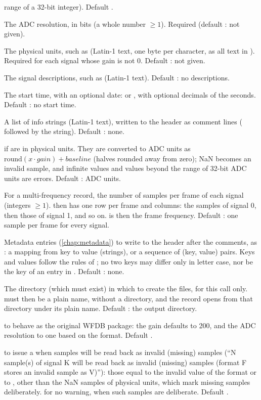 \begin{params}
  range of a 32-bit integer). Default .
\item[adcres] The ADC resolution, in bits (a whole number $\ge 1$). Required (default
  : not given).
\item[units] The physical units, such as  (Latin-1 text, one byte per
  character, as all text in ). Required for each signal whose gain is not 0.
  Default : not given.
\item[names] The signal descriptions, such as  (Latin-1 text). Default
  : no descriptions.
\item[base\_time] The start time, with an optional date:
   or , with optional decimals of the
  seconds. Default : no start time.
\item[comments] A list of info strings (Latin-1 text), written to the header as comment lines
  ( followed by the string). Default : none.
\item[physical]  if  are in physical units. They are converted
  to ADC units as $\mathrm{round}(x \cdot \mathit{gain}) + \mathit{baseline}$ (halves
  rounded away from zero); NaN becomes an invalid sample, and infinite values and values
  beyond the range of 32-bit ADC units are errors. Default : ADC units.
\item[samps\_per\_frame] For a multi-frequency record, the number of samples per frame of
  each signal (integers $\ge 1$).  then has one row per frame and
   columns: the samples of signal 0, then those of signal 1,
  and so on.  is then the frame frequency. Default : one sample per
  frame for every signal.
\item[metadata] Metadata entries (\cref{chap:metadata}) to write to the header after the
  comments, as : a mapping from key to value (strings), or a sequence
  of (key, value) pairs. Keys and values follow the rules of ; no two
  keys may differ only in letter case, nor be the key of an entry in .
  Default : none.
\item[dir] The directory (which must exist) in which to create the files, for this call
  only.  must then be a plain name, without a directory, and the record opens
  from that directory under its plain name. Default : the output directory.
\item[legacy]  to behave as the original WFDB package: the gain defaults to
  200, and the ADC resolution to one based on the format. Default .
\item[invalid\_warning]  to issue a  when samples will be
  read back as invalid (missing) samples (``N sample(s) of signal K will be read back as
  invalid (missing) samples (format F stores an invalid sample as V)''): those equal to
  the invalid value of the format or to , other than the NaN
  samples of physical units, which mark missing samples deliberately.  for
  no warning, when such samples are deliberate. Default .
\end{params}
